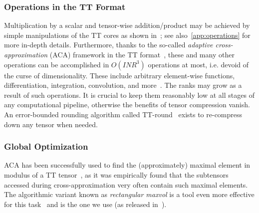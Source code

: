 \documentclass[review, twocolumn]{svjour3}          %
\begin{document}


\subsubsection{Operations in the TT Format}

Multiplication by a scalar and tensor-wise addition/product may be achieved by simple manipulations of the TT cores as shown in~\cite{Oseledets:11}; see also~\ref{app:operations} for more in-depth details. Furthermore, thanks to the so-called \emph{adaptive cross-approximation} (ACA) framework in the TT format~\cite{OT:10, SO:11}, these and many other operations can be accomplished in $O(I N R^3)$ operations at most, i.e. devoid of the curse of dimensionality. These include arbitrary element-wise functions, differentiation, integration, convolution, and more~\cite{CLOPZM:16, LC:17}. The ranks may grow as a result of such operations. It is crucial to keep them reasonably low at all stages of any computational pipeline, otherwise the benefits of tensor compression vanish. An error-bounded rounding algorithm called TT-round~\cite{Oseledets:11} exists to re-compress down any tensor when needed.

\subsubsection{Global Optimization} \label{sec:global_optimization}

ACA has been successfully used to find the (approximately) maximal element in modulus of a TT tensor~\cite{DKLM:14, OZTSKS:15}, as it was empirically found that the subtensors accessed during cross-approximation very often contain such maximal elements. The algorithmic variant known as \emph{rectangular maxvol} is a tool even more effective for this task~\cite{MO:15} and is the one we use (as released in~\cite{ttpy}).
\end{document}
